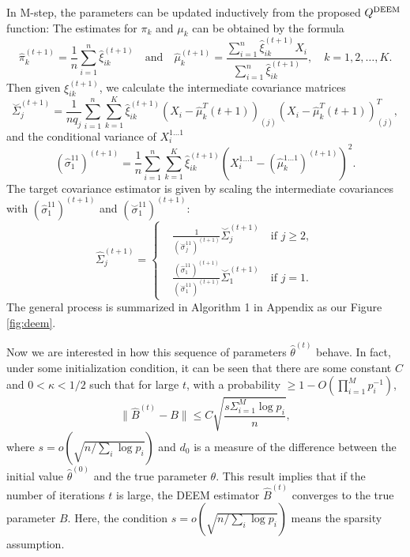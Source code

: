 \documentclass[11pt]{article}
\newcommand{\wh}{\widehat}
\begin{document}
In M-step, the parameters can be updated inductively from the proposed $Q^{\textup{DEEM}}$ function:
The estimates for $\pi_k$ and $\mu_k$ can be obtained by the formula
\begin{equation*}
  \wh\pi_k^{(t+1)} = \frac{1}{n}\sum_{i=1}^n \wh\xi_{ik}^{(t+1)} \quad\text{and}\quad \wh\mu_k^{(t+1)} = \frac{\sum_{i=1}^n \wh\xi_{ik}^{(t+1)}X_i}{\sum_{i=1}^n \wh\xi_{ik}^{(t+1)}} ,\quad k=1,2,\dots, K.
\end{equation*}
Then given $\xi_{ik}^{(t+1)}$, we calculate the intermediate covariance matrices
\begin{equation*}
  \overset  \smile \Sigma^{(t+1)}_j = \frac{1}{nq_j} \sum_{i=1}^n \sum_{k=1}^K \wh\xi^{(t+1)}_{ik} (X_i - \wh\mu_k^T{(t+1)})_{(j)} (X_i - \wh\mu_k^T{(t+1)})_{(j)} ^T,
\end{equation*}
and the conditional variance of $X_i^{1\dots1}$
\begin{equation*}
  (\wh\sigma_{1}^{11})^{(t+1)} = \frac{1}{n}\sum_{i=1}^n \sum_{k=1}^K \wh\xi_{ik}^{(t+1)} (X_i^{1\dots1}-(\wh \mu_{k}^{1\dots1})^{(t+1)})^2.
\end{equation*}
The target covariance estimator is given by scaling the intermediate covariances with $(\wh\sigma_{1}^{11})^{(t+1)}$ and $(\overset \smile \sigma_1^{11})^{(t+1)}$:
\begin{equation*}
  \wh \Sigma_j^{(t+1)} =
  \left\{
  \begin{aligned}
  	&\frac{1}{(\overset \smile \sigma_j^{11})^{(t+1)}}\overset \smile \Sigma_j^{(t+1)} \quad \text{if $j\ge 2$}, \\
  	&\frac{(\wh \sigma_1^{11})^{(t+1)}}{(\overset \smile \sigma_1^{11})^{(t+1)}}\overset \smile \Sigma_1^{(t+1)} \quad \text{if $j= 1$}.
  \end{aligned}
  \right.
\end{equation*}
The general process is summarized in Algorithm 1 in Appendix as our Figure \ref{fig:deem}.

Now we are interested in how this sequence of parameters $\wh\theta^{(t)}$ behave.
In fact, under some initialization condition, it can be seen that there are some constant $C$ and $0<\kappa<1/2$ such that for large $t$, with a probability $\ge 1- O(\prod_{i=1}^M p_i^{-1})$,
$$
\|\wh B^{(t)} - B\| \le C\sqrt{\frac{s \Sigma_{i=1}^M \log p_i}{n}},
$$
where $s=o(\sqrt{n/\sum_i \log p_i})$ and $d_0$ is a measure of the difference between the initial value $\wh \theta^{(0)}$ and the true parameter $\theta$.
This result implies that if the number of iterations $t$ is large, the DEEM estimator $\wh B^{(t)}$ converges to the true parameter $B$.
Here, the condition $s=o(\sqrt{n/\sum_i \log p_i})$ means the sparsity assumption.
\end{document}
